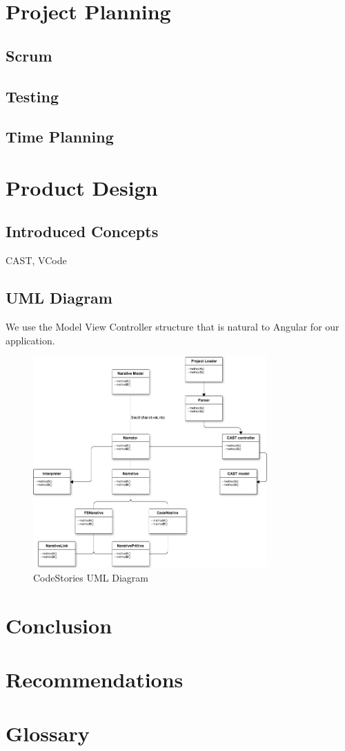 \documentclass[12pt]{article}
\begin{document}
\section{Project Planning}
\subsection{Scrum}
\subsection{Testing}
\subsection{Time Planning}

\section{Product Design}
\subsection{Introduced Concepts}
CAST, VCode
\subsection{UML Diagram}
We use the Model View Controller structure that is natural to Angular for our application. 
\begin{figure}[H]
 \centering
 \includegraphics[width=0.8\textwidth]{uml-webos.png}
 \caption{CodeStories UML Diagram}
 \label{fig:uml_diagram}
\end{figure}

\section{Conclusion}

\section{Recommendations}

\section{Glossary}
\end{document}
